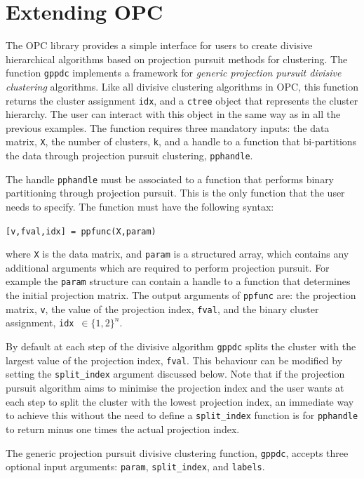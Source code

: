 \documentclass{book}
\begin{document}
\chapter{Extending OPC}\label{sec:extend}


The OPC library provides a simple interface for users to create divisive
hierarchical algorithms based on projection pursuit methods for clustering. 
%
The function {\tt gppdc} implements a framework for {\em generic projection
pursuit divisive clustering} algorithms.
%
Like all divisive clustering algorithms in OPC, this function returns the
cluster assignment {\tt idx}, and a {\tt ctree} object that represents the
cluster hierarchy. The user can interact with this object in the same way as in
all the previous examples.
%
The function requires three mandatory inputs: the data matrix, {\tt X}, the
number of clusters, {\tt k}, and a handle to a function that bi-partitions the
data through projection pursuit clustering, {\tt pphandle}.


The handle {\tt pphandle} must be associated to a function that performs binary
partitioning through projection pursuit. This is the only function that the
user needs to specify. The function must have the following syntax:

\begin{center}
{\tt [v,fval,idx] = ppfunc(X,param)}
\end{center}
%
where {\tt X} is the data matrix, and {\tt param} is a structured array, which
%
contains any additional arguments which are required to perform projection pursuit.
%
For example the {\tt param} structure can contain a handle to a function that
determines the initial projection matrix.
%
The output arguments of {\tt ppfunc}
are: the projection matrix, {\tt v}, the value of the projection index,
{\tt fval}, and the binary cluster assignment, {\tt idx}~$\in \{1,2\}^n$.

By default at each step of the divisive algorithm {\tt gppdc} splits the
cluster with the largest value of the projection index, {\tt fval}. This
behaviour can be modified by setting the {\tt split\_index} argument discussed
below. Note that if the projection pursuit algorithm aims to minimise the
projection index and the user wants at each step to split the cluster with the
lowest projection index, an immediate way to achieve this without the need to
define a {\tt split\_index} function is for {\tt pphandle} to return minus one
times the actual projection index.

The generic projection pursuit divisive clustering function, {\tt gppdc},
accepts three optional input arguments: {\tt param}, {\tt split\_index}, and
{\tt labels}.
\end{document}
